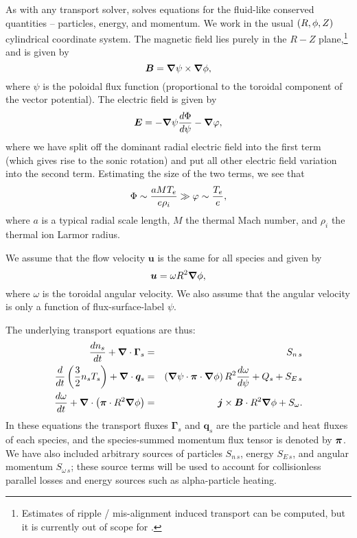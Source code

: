 \documentclass{revtex4}
\providecommand{\pitens}{\tensor{\pi}}
\begin{document}
As with any transport solver, \mctrans{} solves equations for the fluid-like conserved quantities -- particles, energy, and momentum.
We work in the usual $(R,\phi,Z)$ cylindrical coordinate system.
The magnetic field lies purely in the $R-Z$ plane,\footnote{Estimates of ripple / mis-alignment induced transport can be computed, but it is currently out of scope for \mctrans{}.}
and is given by
\begin{equation}
\bm{B} = \bm{\nabla}\psi\times\bm{\nabla} \phi,
\end{equation}
where $\psi$ is the poloidal flux function (proportional to the toroidal component of the vector potential).
The electric field is given by
\begin{equation}
\bm{E} = -\bm{\nabla} \psi \frac{d \Phi}{d\psi} - \bm{\nabla} \varphi,
\end{equation}
where we have split off the dominant radial electric field into the first term (which gives rise to the sonic rotation) and put all other electric field variation into the second term. Estimating the size of the two terms, we see that
\begin{equation}
\Phi \sim \frac{a M T_e}{e \rho_i} \gg \varphi \sim \frac{T_e}{e},
\end{equation}
where $a$ is a typical radial scale length, $M$ the thermal Mach number, and $\rho_i$ the thermal ion Larmor radius.

We assume that the flow velocity $\bm{u}$ is the same for all species and given by
\begin{equation}
\bm{u} = \omega R^2 \bm{\nabla}\phi,
\end{equation}
where $\omega$ is the toroidal angular velocity. We also assume that the angular velocity is only a function of flux-surface-label $\psi$.

The underlying transport equations are thus:
\begin{eqnarray}
\label{parttrans}
\frac{d n_s}{dt} + \dv\bm{\Gamma}_s &=& S_{n\,s}\\
		\label{heattrans}
\frac{d}{dt} \left( \frac{3}{2} n_s T_s \right) + \dv\bm{q}_s &=& \left(\grad\psi \cdot \pitens \cdot \grad\tor\right) R^2 \frac{d\omega}{d \psi}   + Q_s + S_{E\,s}\\
	\label{momtrans}
\frac{d \omega}{dt} + \dv\left(\pitens\cdot R^2\grad\tor\right) &=& \bm{j} \times\bm{B} \cdot R^2\grad\tor + S_{\omega}.
\end{eqnarray}
In these equations the transport fluxes $\bm{\Gamma}_s$ and $\bm{q}_s$ are the particle and heat fluxes of each species, and the species-summed momentum flux tensor is denoted by $\pitens$. We have also included arbitrary sources of particles $S_{n\,s}$, energy $S_{E\,s}$, and angular momentum $S_{\omega\,s}$; these source terms will be used to account for collisionless parallel losses and energy sources such as alpha-particle heating.
\end{document}
